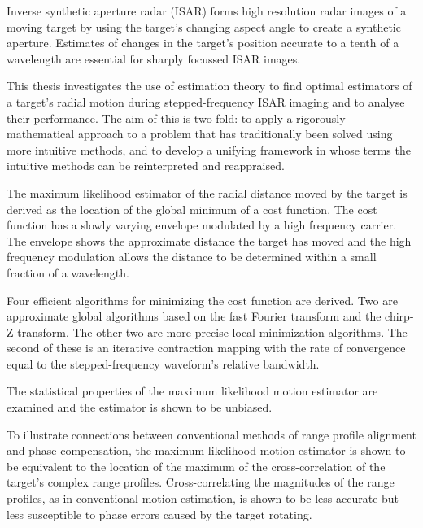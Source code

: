 %
%
%
%
%
%
%


Inverse synthetic aperture radar (ISAR) forms high resolution radar images
of a moving target by using the target's changing aspect angle to create a
synthetic aperture.  Estimates of changes in the target's position accurate
to a tenth of a wavelength are essential for sharply focussed ISAR images.

This thesis investigates the use of estimation theory to find optimal
estimators of a target's radial motion during stepped-frequency ISAR
imaging and to analyse their performance.  The aim of this is two-fold: to
apply a rigorously mathematical approach to a problem that has
traditionally been solved using more intuitive methods, and to develop a
unifying framework in whose terms the intuitive methods can be
reinterpreted and reappraised.

The maximum likelihood estimator of the radial distance moved by the target
is derived as the location of the global minimum of a cost function. The
cost function has a slowly varying envelope modulated by a high frequency
carrier.  The envelope shows the approximate distance the target has moved
and the high frequency modulation allows the distance to be determined
within a small fraction of a wavelength.  

Four efficient algorithms for minimizing the cost function are derived. Two
are approximate global algorithms based on the fast Fourier transform and
the chirp-Z transform.  The other two are more precise local minimization
algorithms.  The second of these is an iterative contraction mapping with
the rate of convergence equal to the stepped-frequency waveform's relative
bandwidth.  

The statistical properties of the maximum likelihood motion estimator are
examined and the estimator is shown to be unbiased.

To illustrate connections between conventional methods of range profile
alignment and phase compensation, the maximum likelihood motion estimator is shown
to be equivalent to the location of the maximum of the cross-correlation of
the target's complex range profiles.  Cross-correlating the magnitudes of
the range profiles, as in conventional motion estimation, is shown to be
less accurate but less susceptible to phase errors caused by the target
rotating.  

